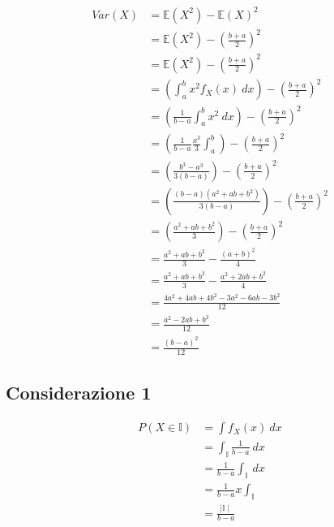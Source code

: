 \documentclass[11pt]{report}
\begin{document}
\begin{itemize}
\begin{equation}
\begin{split}
   			Var(X) & = \mathbb{E}(X^2) - \mathbb{E}(X)^2\\
   			& = \mathbb{E}(X^2) - \left( \frac{b+a}{2} \right)^2\\
            & = \mathbb{E}(X^2) - \left( \frac{b+a}{2} \right)^2\\
            & = \left( \int_a^b x^2 f_X(x)\ dx \right) - \left( \frac{b+a}{2} \right)^2\\
            & = \left( \frac{1}{b-a} \int_a^b x^2\ dx \right) - \left( \frac{b+a}{2} \right)^2\\
            & = \left( \frac{1}{b-a} \frac{x^3}{3} \int_a^b \right) - \left( \frac{b+a}{2} \right)^2\\
            & = \left( \frac{b^3-a^3}{3(b-a)} \right) - \left( \frac{b+a}{2} \right)^2\\
            & = \left( \frac{(b-a)(a^2+ab+b^2)}{3(b-a)} \right) - \left( \frac{b+a}{2} \right)^2\\
            & = \left( \frac{a^2+ab+b^2}{3} \right) - \left( \frac{b+a}{2} \right)^2\\
            & = \frac{a^2+ab+b^2}{3} - \frac{(a+b)^2}{4}\\
            & = \frac{a^2+ab+b^2}{3} - \frac{a^2+2ab+b^2}{4}\\
            & = \frac{4a^2+4ab+4b^2-3a^2-6ab-3b^2}{12}\\
            & = \frac{a^2-2ab+b^2}{12}\\
            & = \frac{(b-a)^2}{12}
		\end{split}
    \end{equation}
\end{itemize}
\begin{center}
    
\end{center}
\begin{center}
    
\end{center}
\subsection{Considerazione 1}
\begin{equation}
    \begin{split}
        P(X \in \mathbb{I}) & = \int f_X(x)\ dx\\
        & = \int_\mathbb{I} \frac{1}{b-a}\ dx\\
        & = \frac{1}{b-a} \int_\mathbb{I}\ dx\\
        & = \frac{1}{b-a} x \int_\mathbb{I}\\
        & = \frac{\mid \mathbb{I} \mid}{b-a}
    \end{split}
\end{equation}
\end{document}

